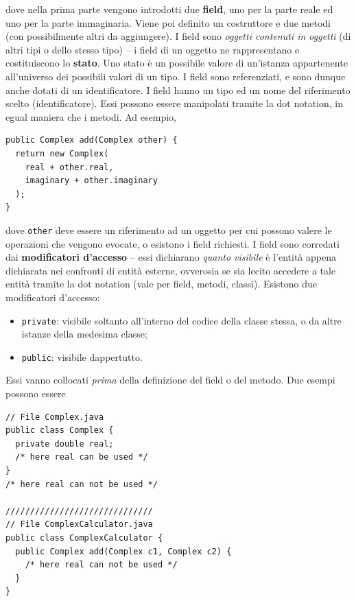 \documentclass[\fontsizeclass,twocolumn]{\classname}
\theoremstyle{definition}
\theoremstyle{definition}
\begin{document}
dove nella prima parte vengono introdotti due \textbf{field}, uno per la parte
reale ed uno per la parte immaginaria. Viene poi definito un costruttore e due
metodi (con possibilmente altri da aggiungere). I field sono \emph{oggetti
contenuti in oggetti} (di altri tipi o dello stesso tipo) \--- i field di un
oggetto ne rappresentano e costituiscono lo \textbf{stato}. Uno stato è un
possibile valore di un'istanza appartenente all'universo dei possibili valori
di un tipo. I field sono referenziati, e sono dunque anche dotati di un
identificatore. I field hanno un tipo ed un nome del riferimento scelto
(identificatore). Essi possono essere manipolati tramite la dot notation, in
egual maniera che i metodi. Ad esempio,

\begin{lstlisting}
public Complex add(Complex other) {
  return new Complex(
    real + other.real,
    imaginary + other.imaginary
  );
}
\end{lstlisting}

dove \texttt{other} deve essere un riferimento ad un oggetto per cui possono
valere le operazioni che vengono evocate, o esistono i field richiesti. I field
sono corredati dai \textbf{modificatori d'accesso} \--- essi dichiarano
\emph{quanto visibile} è l'entità appena dichiarata nei confronti di entità
esterne, ovverosia se sia lecito accedere a tale entità tramite la dot notation
(vale per field, metodi, classi). Esistono due modificatori d'accesso:
\begin{itemize}
        \item \texttt{private}: visibile soltanto all'interno del codice della
                classe stessa, o da altre istanze della medesima classe;
        \item \texttt{public}: visibile dappertutto.
\end{itemize}
Essi vanno collocati \emph{prima} della definizione del field o del metodo. Due
esempi possono essere

\begin{lstlisting}
// File Complex.java
public class Complex {
  private double real;
  /* here real can be used */
}
/* here real can not be used */

//////////////////////////////
// File ComplexCalculator.java
public class ComplexCalculator {
  public Complex add(Complex c1, Complex c2) {
    /* here real can not be used */
  }
}
\end{lstlisting}
\end{document}
